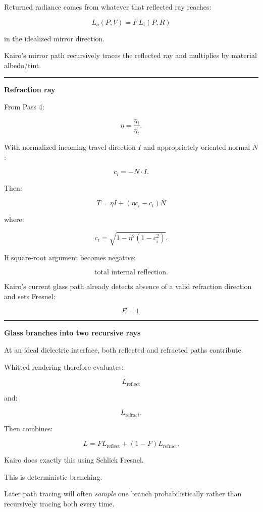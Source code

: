 Returned radiance comes from whatever that reflected ray reaches:

\[
\boxed{
L_o(P,V)
=
F\,L_i(P,R)
}
\]

in the idealized mirror direction.

Kairo's mirror path recursively traces the reflected ray and multiplies by material albedo/tint.

\begin{center}\rule{0.5\linewidth}{0.5pt}\end{center}

\textbf{Refraction ray}

From Pass 4:

\[
\eta=
\frac{\eta_i}{\eta_t}.
\]

With normalized incoming travel direction \(I\) and appropriately oriented normal \(N\):

\[
c_i=-N\cdot I.
\]

Then:

\[
\boxed{
T=
\eta I+
(\eta c_i-c_t)N
}
\]

where:

\[
c_t
=
\sqrt{
1-\eta^2(1-c_i^2)
}.
\]

If square-root argument becomes negative:

\[
\boxed{\text{total internal reflection}.}
\]

Kairo's current glass path already detects absence of a valid refraction direction and sets Fresnel:

\[
F=1.
\]

\begin{center}\rule{0.5\linewidth}{0.5pt}\end{center}

\textbf{Glass branches into two recursive rays}

At an ideal dielectric interface, both reflected and refracted paths contribute.

Whitted rendering therefore evaluates:

\[
L_{\text{reflect}}
\]

and:

\[
L_{\text{refract}}.
\]

Then combines:

\[
\boxed{
L=
F L_{\text{reflect}}
+
(1-F)L_{\text{refract}}.
}
\]

Kairo does exactly this using Schlick Fresnel.

This is deterministic branching.

Later path tracing will often \emph{sample} one branch probabilistically rather than recursively tracing both every time.

